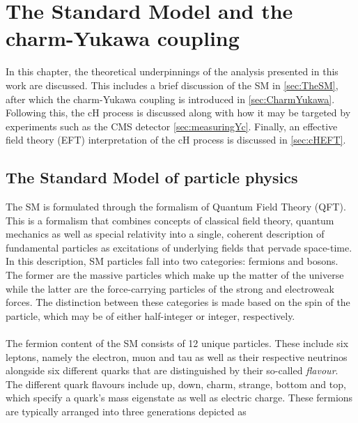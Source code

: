 \chapter{The Standard Model and the charm-Yukawa coupling}
\label{chap:Theory}
In this chapter, the theoretical underpinnings of the analysis presented in this work are discussed. This includes a brief discussion of the SM in \autoref{sec:TheSM}, after which the charm-Yukawa coupling is introduced in \autoref{sec:CharmYukawa}. Following this, the cH process is discussed along with how it may be targeted by experiments such as the CMS detector \autoref{sec:measuringYc}. Finally, an effective field theory (EFT) interpretation of the cH process is discussed in \autoref{sec:cHEFT}.


\section{The Standard Model of particle physics}
\label{sec:TheSM}
The SM is formulated through the formalism of Quantum Field Theory (QFT). This is a formalism that combines concepts of classical field theory, quantum mechanics as well as special relativity into a single, coherent description of fundamental particles as excitations of underlying fields that pervade space-time. In this description, SM particles fall into two categories: fermions and bosons. The former are the massive particles which make up the matter of the universe while the latter are the force-carrying particles of the strong and electroweak forces. The distinction between these categories is made based on the spin of the particle, which may be of either half-integer or integer, respectively. \\
\\
The fermion content of the SM consists of 12 unique particles. These include six leptons, namely the electron, muon and tau as well as their respective neutrinos alongside six different quarks that are distinguished by their so-called \textit{flavour}. The different quark flavours include up, down, charm, strange, bottom and top, which specify a quark's mass eigenstate as well as electric charge. These fermions are typically arranged into three generations depicted as

